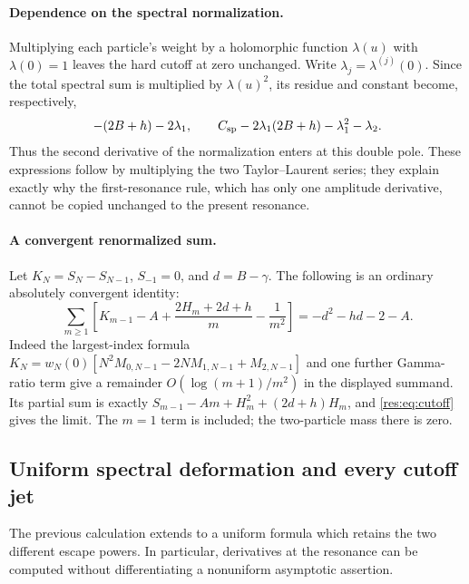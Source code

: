 \documentclass[11pt,letterpaper]{article}
\numberwithin{equation}{section}
\theoremstyle{plain}
\theoremstyle{definition}
\theoremstyle{remark}
\begin{document}
\paragraph{Dependence on the spectral normalization.}
Multiplying each particle's weight by a holomorphic function
$\lambda(u)$ with $\lambda(0)=1$ leaves the hard cutoff at zero
unchanged.  Write $\lambda_j=\lambda^{(j)}(0)$.  Since the total
spectral sum is multiplied by $\lambda(u)^2$, its residue and
constant become, respectively,
\[
 -(2B+h)-2\lambda_1,\qquad
 C_{\rm sp}-2\lambda_1(2B+h)-\lambda_1^2-\lambda_2.
\]
Thus the second derivative of the normalization enters at this
double pole.  These expressions follow by multiplying the two
Taylor--Laurent series; they explain exactly why the first-resonance
rule, which has only one amplitude derivative, cannot be copied
unchanged to the present resonance.

\paragraph{A convergent renormalized sum.}
Let $K_N=S_N-S_{N-1}$, $S_{-1}=0$, and $d=B-\gamma$.
The following is an ordinary absolutely convergent identity:
\begin{equation}
 \sum_{m\geq1}\left[
 K_{m-1}-A+\frac{2H_m+2d+h}{m}-\frac1{m^2}\right]
   =-d^2-hd-2-A.\label{res:eq:mass-sum}
\end{equation}
Indeed the largest-index formula
$K_N=w_N(0)[N^2M_{0,N-1}-2NM_{1,N-1}+M_{2,N-1}]$
and one further Gamma-ratio term give a remainder
$O(\log(m+1)/m^2)$ in the displayed summand.  Its partial sum is
exactly $S_{m-1}-Am+H_m^2+(2d+h)H_m$, and
\eqref{res:eq:cutoff} gives the limit.  The $m=1$ term is included;
the two-particle mass there is zero.

\subsection{Uniform spectral deformation and every cutoff jet}
The previous calculation extends to a uniform formula which retains
the two different escape powers.  In particular, derivatives at the
resonance can be computed without differentiating a nonuniform
asymptotic assertion.
\end{document}
